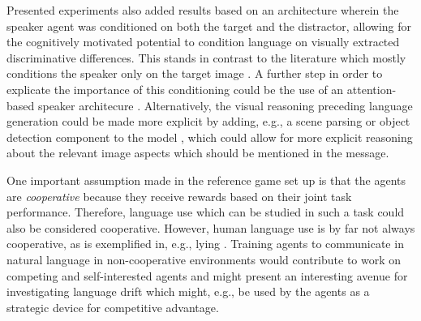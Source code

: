 Presented experiments also added results based on an architecture wherein the speaker agent was conditioned on both the target and the distractor, allowing for the cognitively motivated potential to condition language on visually extracted discriminative differences. This stands in contrast to the literature which mostly conditions the speaker only on the target image \parencite[except for][]{lazaridou2016multi, lazaridou2020multi}. A further step in order to explicate the importance of this conditioning could be the use of an attention-based speaker architecure \parencite[e.g., akin to][]{lee2019countering}. Alternatively, the visual reasoning preceding language generation could be made more explicit by adding, e.g., a scene parsing or object detection component to the model \parencite[e.g.,][]{zhao2017pyramid}, which could allow for more explicit reasoning about the relevant image aspects which should be mentioned in the message.

One important assumption made in the reference game set up is that the agents are \emph{cooperative} because they receive rewards based on their joint task performance. Therefore, language use which can be studied in such a task could also be considered cooperative. However, human language use is by far not always cooperative, as is exemplified in, e.g., lying \parencite{franke2020strategies}. Training agents to communicate in natural language in non-cooperative environments would contribute to work on competing and self-interested agents \parencite[cf.][]{lazaridou2020emergent} and might present an interesting avenue for investigating language drift which might, e.g., be used by the agents as a strategic device for competitive advantage. 


